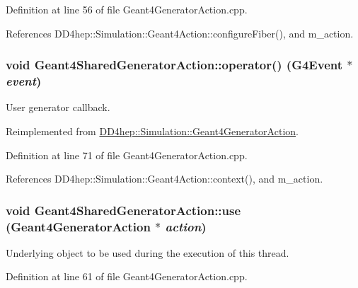 Definition at line 56 of file Geant4GeneratorAction.cpp.

References DD4hep::Simulation::Geant4Action::configureFiber(), and m\_\-action.\hypertarget{class_d_d4hep_1_1_simulation_1_1_geant4_shared_generator_action_a21ff9d287af96c7bb0a3cf8975cac070}{
\subsubsection[{operator()}]{\setlength{\rightskip}{0pt plus 5cm}void Geant4SharedGeneratorAction::operator() (G4Event $\ast$ {\em event})}}
\label{class_d_d4hep_1_1_simulation_1_1_geant4_shared_generator_action_a21ff9d287af96c7bb0a3cf8975cac070}


User generator callback. 

Reimplemented from \hyperlink{class_d_d4hep_1_1_simulation_1_1_geant4_generator_action_ac5a1d2335a19e3f9d555081199e01801}{DD4hep::Simulation::Geant4GeneratorAction}.

Definition at line 71 of file Geant4GeneratorAction.cpp.

References DD4hep::Simulation::Geant4Action::context(), and m\_\-action.\hypertarget{class_d_d4hep_1_1_simulation_1_1_geant4_shared_generator_action_af092e3cb7a9419081c990106067fb90c}{
\subsubsection[{use}]{\setlength{\rightskip}{0pt plus 5cm}void Geant4SharedGeneratorAction::use ({\bf Geant4GeneratorAction} $\ast$ {\em action})}}
\label{class_d_d4hep_1_1_simulation_1_1_geant4_shared_generator_action_af092e3cb7a9419081c990106067fb90c}


Underlying object to be used during the execution of this thread. 

Definition at line 61 of file Geant4GeneratorAction.cpp.

